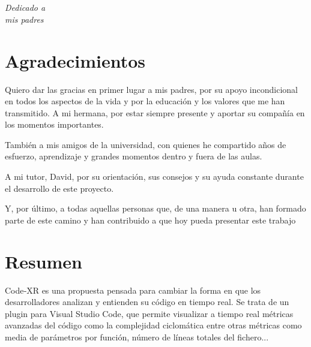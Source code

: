 \documentclass[a4paper, 12pt]{book}
\begin{document}

\chapter*{}
\begin{flushright}
\textit{Dedicado a \\
mis padres}
\end{flushright}


\chapter*{Agradecimientos}
Quiero dar las gracias en primer lugar a mis padres, por su apoyo incondicional en todos los aspectos de la vida y por la educación y los valores que me han transmitido. A mi hermana, por estar siempre presente y aportar su compañía en los momentos importantes.

También a mis amigos de la universidad, con quienes he compartido años de esfuerzo, aprendizaje y grandes momentos dentro y fuera de las aulas.

A mi tutor, David, por su orientación, sus consejos y su ayuda constante durante el desarrollo de este proyecto.

Y, por último, a todas aquellas personas que, de una manera u otra, han formado parte de este camino y han contribuido a que hoy pueda presentar este trabajo

\chapter*{Resumen}

Code‑XR es una propuesta pensada para cambiar la forma en que los desarrolladores analizan y entienden su código en tiempo real. Se trata de un plugin para Visual Studio Code, que permite visualizar a tiempo real métricas avanzadas del código como la complejidad ciclomática entre otras métricas como media de parámetros por función, número de líneas totales del fichero...
\end{document}
